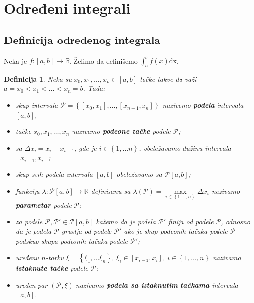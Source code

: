 \documentclass{article}
\newtheorem{definicija}{Definicija}[section]
\begin{document}
\section{Određeni integrali}

\subsection{Definicija određenog integrala}

Neka je $f:\left[a,b\right]\longrightarrow\mathbb{R}$. Želimo da definišemo $\displaystyle\int_{a}^{b}f\left(x\right)\text{dx}$.\par

\begin{defbox}
    \label{definicija_2.1}
    \begin{definicija}
        Neka su $x_0,x_1,\dotsc,x_n\in\left[a,b\right]$ tačke takve da važi $a=x_0<x_1<\dotsc<x_n=b$. Tada:
        \begin{itemize}
            \item skup intervala $\mathcal{P}=\left\{\left[x_0,x_1\right],\dotsc,\left[x_{n-1},x_n\right]\right\}$ nazivamo \textbf{podela} intervala $\left[a,b\right]$;
            \item tačke $x_0,x_1,\dotsc,x_n$ nazivamo \textbf{podeone tačke} podele $\mathcal{P}$;
            \item sa $\varDelta x_i=x_i-x_{i-1}$, gde je $i\in\left\{1,\dotsc n\right\}$, obeležavamo dužinu intervala $\left[x_{i-1},x_i\right]$;
            \item skup svih podela intervala $\left[a,b\right]$ obeležavamo sa $\mathcal{P}\left[a,b\right]$;
            \item funkciju $\lambda: \mathcal{P}\left[a,b\right]\longrightarrow \mathbb{R}$ definisanu sa $\lambda\left(\mathcal{P}\right)=\underset{i \in \left\{1, \dots, n\right\}}{\max}\varDelta x_i$ nazivamo \textbf{parametar} podele $\mathcal{P}$;
            \item za podele $\mathcal{P},\mathcal{P}'\in\mathcal{P}\left[a,b\right]$ kažemo da je podela $\mathcal{P}'$ finija od podele $\mathcal{P}$, odnosno da
                  je podela $\mathcal{P}$ grublja od podele $\mathcal{P}'$ ako je skup podeonih tačaka podele $\mathcal{P}$ podskup skupa
                  podeonih tačaka podele $\mathcal{P}'$;
            \item uređenu $n$-torku $\xi=\left\{\xi_1,\dotsc\xi_n\right\}$, $\xi_i\in\left[x_{i-1},x_i\right]$, $i\in\left\{1,\dotsc,n\right\}$ nazivamo \textbf{istaknute tačke} podele $\mathcal{P}$;
            \item uređen par $\left(\mathcal{P},\xi\right)$ nazivamo \textbf{podela sa istaknutim tačkama} intervala $\left[a,b\right]$.
        \end{itemize}
    \end{definicija}
\end{defbox}
\end{document}
